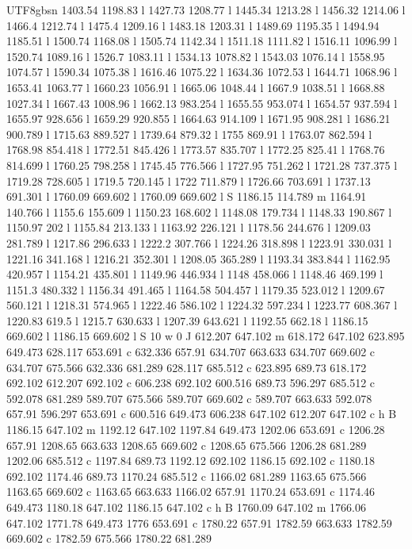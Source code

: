 \documentclass[11pt,a4paper,oneside]{report}
\begin{document}
\begin{CJK*}{UTF8}{gbsn}
{1403.54 1198.83 l 1427.73 1208.77 l 1445.34 1213.28 l 1456.32 1214.06 l 1466.4 1212.74 l 1475.4 1209.16 l
1483.18 1203.31 l 1489.69 1195.35 l 1494.94 1185.51 l 1500.74 1168.08 l 1505.74 1142.34 l 1511.18 1111.82
l 1516.11 1096.99 l 1520.74 1089.16 l 1526.7 1083.11 l 1534.13 1078.82 l 1543.03 1076.14 l 1558.95
1074.57 l 1590.34 1075.38 l 1616.46 1075.22 l 1634.36 1072.53 l 1644.71 1068.96 l 1653.41 1063.77 l
1660.23 1056.91 l 1665.06 1048.44 l 1667.9 1038.51 l 1668.88 1027.34 l 1667.43 1008.96 l 1662.13 983.254
l 1655.55 953.074 l 1654.57 937.594 l 1655.97 928.656 l 1659.29 920.855 l 1664.63 914.109 l 1671.95
908.281 l 1686.21 900.789 l 1715.63 889.527 l 1739.64 879.32 l 1755 869.91 l 1763.07 862.594 l 1768.98
854.418 l 1772.51 845.426 l 1773.57 835.707 l 1772.25 825.41 l 1768.76 814.699 l 1760.25 798.258 l
1745.45 776.566 l 1727.95 751.262 l 1721.28 737.375 l 1719.28 728.605 l 1719.5 720.145 l 1722 711.879 l
1726.66 703.691 l 1737.13 691.301 l 1760.09 669.602 l 1760.09 669.602 l S 1186.15 114.789 m 1164.91
140.766 l 1155.6 155.609 l 1150.23 168.602 l 1148.08 179.734 l 1148.33 190.867 l 1150.97 202 l 1155.84
213.133 l 1163.92 226.121 l 1178.56 244.676 l 1209.03 281.789 l 1217.86 296.633 l 1222.2 307.766 l
1224.26 318.898 l 1223.91 330.031 l 1221.16 341.168 l 1216.21 352.301 l 1208.05 365.289 l 1193.34 383.844
l 1162.95 420.957 l 1154.21 435.801 l 1149.96 446.934 l 1148 458.066 l 1148.46 469.199 l 1151.3 480.332 l
1156.34 491.465 l 1164.58 504.457 l 1179.35 523.012 l 1209.67 560.121 l 1218.31 574.965 l 1222.46 586.102
l 1224.32 597.234 l 1223.77 608.367 l 1220.83 619.5 l 1215.7 630.633 l 1207.39 643.621 l 1192.55 662.18 l
1186.15 669.602 l 1186.15 669.602 l S 10 w 0 J 612.207 647.102 m 618.172 647.102 623.895 649.473 628.117
653.691 c 632.336 657.91 634.707 663.633 634.707 669.602 c 634.707 675.566 632.336 681.289 628.117
685.512 c 623.895 689.73 618.172 692.102 612.207 692.102 c 606.238 692.102 600.516 689.73 596.297 685.512
c 592.078 681.289 589.707 675.566 589.707 669.602 c 589.707 663.633 592.078 657.91 596.297 653.691 c
600.516 649.473 606.238 647.102 612.207 647.102 c h B 1186.15 647.102 m 1192.12 647.102 1197.84 649.473
1202.06 653.691 c 1206.28 657.91 1208.65 663.633 1208.65 669.602 c 1208.65 675.566 1206.28 681.289
1202.06 685.512 c 1197.84 689.73 1192.12 692.102 1186.15 692.102 c 1180.18 692.102 1174.46 689.73 1170.24
685.512 c 1166.02 681.289 1163.65 675.566 1163.65 669.602 c 1163.65 663.633 1166.02 657.91 1170.24
653.691 c 1174.46 649.473 1180.18 647.102 1186.15 647.102 c h B 1760.09 647.102 m 1766.06 647.102 1771.78
649.473 1776 653.691 c 1780.22 657.91 1782.59 663.633 1782.59 669.602 c 1782.59 675.566 1780.22 681.289
}
\end{CJK*}
\end{document}
